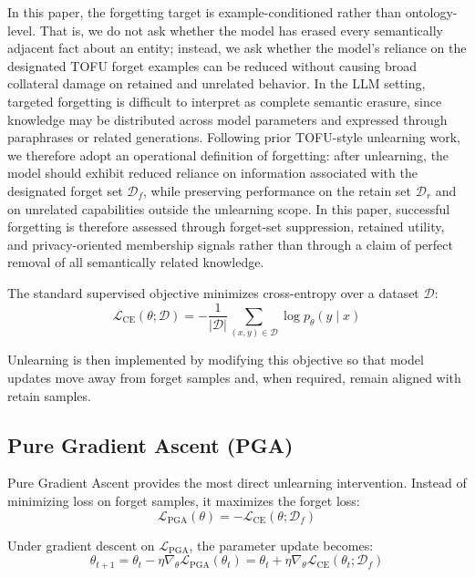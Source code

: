 \documentclass[conference]{IEEEtran}
\begin{document}
In this paper, the forgetting target is example-conditioned rather than ontology-level. That is, we do not ask whether the model has erased every semantically adjacent fact about an entity; instead, we ask whether the model's reliance on the designated TOFU forget examples can be reduced without causing broad collateral damage on retained and unrelated behavior. In the LLM setting, targeted forgetting is difficult to interpret as complete semantic erasure, since knowledge may be distributed across model parameters and expressed through paraphrases or related generations. Following prior TOFU-style unlearning work, we therefore adopt an operational definition of forgetting: after unlearning, the model should exhibit reduced reliance on information associated with the designated forget set $\mathcal{D}_f$, while preserving performance on the retain set $\mathcal{D}_r$ and on unrelated capabilities outside the unlearning scope. In this paper, successful forgetting is therefore assessed through forget-set suppression, retained utility, and privacy-oriented membership signals rather than through a claim of perfect removal of all semantically related knowledge.

The standard supervised objective minimizes cross-entropy over a dataset $\mathcal{D}$:
\begin{equation}
\mathcal{L}_{\mathrm{CE}}(\theta; \mathcal{D}) = -\frac{1}{|\mathcal{D}|}\sum_{(x,y)\in\mathcal{D}} \log p_{\theta}(y\mid x)
\end{equation}

Unlearning is then implemented by modifying this objective so that model updates move away from forget samples and, when required, remain aligned with retain samples.

\subsection{Pure Gradient Ascent (PGA)}
Pure Gradient Ascent provides the most direct unlearning intervention. Instead of minimizing loss on forget samples, it maximizes the forget loss:
\begin{equation}
\mathcal{L}_{\mathrm{PGA}}(\theta) = -\mathcal{L}_{\mathrm{CE}}(\theta; \mathcal{D}_f)
\end{equation}

Under gradient descent on $\mathcal{L}_{\mathrm{PGA}}$, the parameter update becomes:
\begin{equation}
\theta_{t+1} = \theta_t - \eta\nabla_{\theta}\mathcal{L}_{\mathrm{PGA}}(\theta_t) = \theta_t + \eta\nabla_{\theta}\mathcal{L}_{\mathrm{CE}}(\theta_t; \mathcal{D}_f)
\end{equation}
\end{document}
